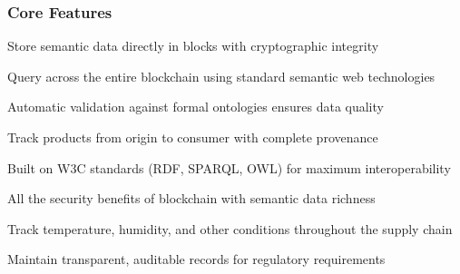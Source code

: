 \documentclass[letterpaper,10pt,english]{sphinxmanual}
\begin{document}
\subsubsection{Core Features}
\label{\detokenize{user-guide/introduction:core-features}}\begin{description}
\sphinxAtStartPar
Store semantic data directly in blocks with cryptographic integrity

\sphinxAtStartPar
Query across the entire blockchain using standard semantic web technologies

\sphinxAtStartPar
Automatic validation against formal ontologies ensures data quality

\sphinxAtStartPar
Track products from origin to consumer with complete provenance

\sphinxAtStartPar
Built on W3C standards (RDF, SPARQL, OWL) for maximum interoperability

\sphinxAtStartPar
All the security benefits of blockchain with semantic data richness

\sphinxAtStartPar
Track temperature, humidity, and other conditions throughout the supply chain

\sphinxAtStartPar
Maintain transparent, auditable records for regulatory requirements

\end{description}
\end{document}
